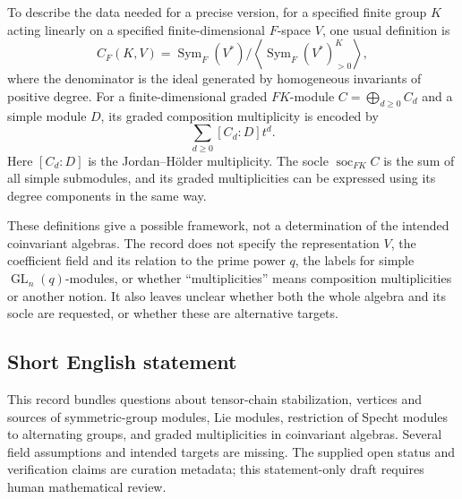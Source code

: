 \documentclass[11pt]{article}
\begin{document}
\begin{enumerate}
To describe the data needed for a precise version, for a specified finite group \(K\) acting linearly on a specified finite-dimensional \(F\)-space \(V\), one usual definition is
\[
C_F(K,V)=\operatorname{Sym}_F(V^*)\big/\left\langle\operatorname{Sym}_F(V^*)^K_{>0}\right\rangle,
\]
where the denominator is the ideal generated by homogeneous invariants of positive degree. For a finite-dimensional graded \(FK\)-module \(C=\bigoplus_{d\geq0}C_d\) and a simple module \(D\), its graded composition multiplicity is encoded by
\[
\sum_{d\geq0}[C_d:D]t^d.
\]
Here \([C_d:D]\) is the Jordan--H\"older multiplicity. The socle \(\operatorname{soc}_{FK}C\) is the sum of all simple submodules, and its graded multiplicities can be expressed using its degree components in the same way.

These definitions give a possible framework, not a determination of the intended coinvariant algebras. The record does not specify the representation \(V\), the coefficient field and its relation to the prime power \(q\), the labels for simple \(\operatorname{GL}_n(q)\)-modules, or whether ``multiplicities'' means composition multiplicities or another notion. It also leaves unclear whether both the whole algebra and its socle are requested, or whether these are alternative targets.
\end{enumerate}
\subsection{Short English statement}
This record bundles questions about tensor-chain stabilization, vertices and sources of symmetric-group modules, Lie modules, restriction of Specht modules to alternating groups, and graded multiplicities in coinvariant algebras. Several field assumptions and intended targets are missing. The supplied open status and verification claims are curation metadata; this statement-only draft requires human mathematical review.
\end{document}
